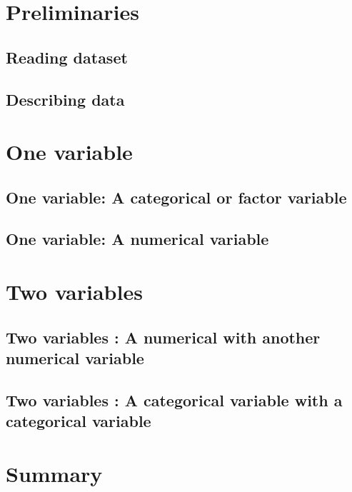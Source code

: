 \documentclass[]{book}
\theoremstyle{definition}
\theoremstyle{definition}
\theoremstyle{definition}
\theoremstyle{remark}
\begin{document}
\section{Preliminaries}\label{preliminaries}

\subsection{Reading dataset}\label{reading-dataset}

\subsection{Describing data}\label{describing-data}

\section{One variable}\label{one-variable}

\subsection{One variable: A categorical or factor
variable}\label{one-variable-a-categorical-or-factor-variable}

\subsection{One variable: A numerical
variable}\label{one-variable-a-numerical-variable}

\section{Two variables}\label{two-variables}

\subsection{Two variables : A numerical with another numerical
variable}\label{two-variables-a-numerical-with-another-numerical-variable}

\subsection{Two variables : A categorical variable with a categorical
variable}\label{two-variables-a-categorical-variable-with-a-categorical-variable}

\section{Summary}\label{summary-2}
\end{document}
